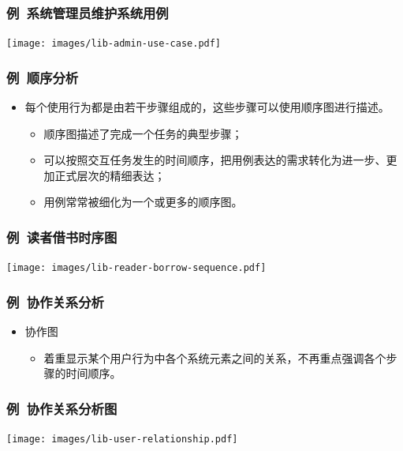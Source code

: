 \documentclass{beamer}
\begin{document}
\begin{frame}
	\frametitle{例~{\small 系统管理员维护系统用例}}
	\texttt{[image: images/lib-admin-use-case.pdf]} 
\end{frame}

\begin{frame}
	\frametitle{例~{\small 顺序分析}}
	\beamertemplatetransparentcovereddynamicmedium
	\begin{itemize}
		\item 每个使用行为都是由若干步骤组成的，这些步骤可以使用顺序图进行描述。
		\begin{itemize}[<+->]
			\item 顺序图描述了完成一个任务的典型步骤；
			\item 可以按照交互任务发生的时间顺序，把用例表达的需求转化为进一步、更加正式层次的精细表达；
			\item 用例常常被细化为一个或更多的顺序图。
		\end{itemize}
	\end{itemize}
\end{frame}

\begin{frame}
	\frametitle{例~{\small 读者借书时序图}}
	\texttt{[image: images/lib-reader-borrow-sequence.pdf]} 
\end{frame}

\begin{frame}
	\frametitle{例~{\small 协作关系分析}}
	\beamertemplatetransparentcovereddynamicmedium
	\begin{itemize}[<+->]
		\item 协作图
		\begin{itemize}
			\item 着重显示某个用户行为中各个系统元素之间的关系，不再重点强调各个步骤的时间顺序。
		\end{itemize}
	\end{itemize}
\end{frame}

\begin{frame}
	\frametitle{例~{\small 协作关系分析图}}
	\texttt{[image: images/lib-user-relationship.pdf]} 
\end{frame}
\end{document}
